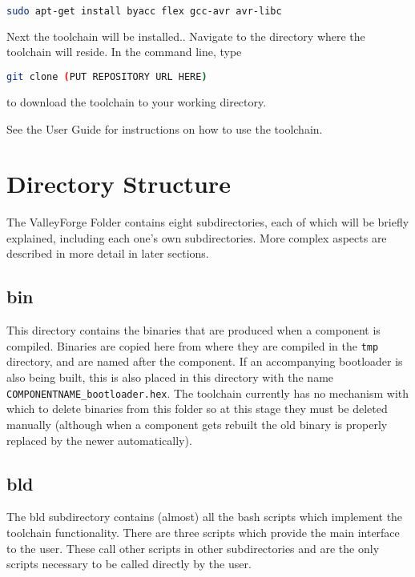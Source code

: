 \documentclass[a4paper, oneside, 11pt, titlepage, onecolumn, openright]{report}
\begin{document}
\begin{lstlisting}[frame=trBL, breaklines=true, language = bash]
sudo apt-get install byacc flex gcc-avr avr-libc
\end{lstlisting}


Next the toolchain will be installed.. Navigate to the directory where the toolchain will reside. 
In the command line, type \newline

\begin{lstlisting}[frame=trBL, breaklines=true, language = bash]
git clone (PUT REPOSITORY URL HERE)
\end{lstlisting}
to download the toolchain to your working directory.

See the User Guide for instructions on how to use the toolchain.
\pagebreak
\chapter{Directory Structure}
			\label{C:Directory Structure}
			
The ValleyForge Folder contains eight subdirectories, each of which will be briefly explained, including each one's own subdirectories. More complex aspects are described in more detail in later sections.

\section{bin}
			\label{s:bin}
			This directory contains the binaries that are produced when a component is compiled. Binaries are copied here from where they are compiled in the \texttt{tmp} directory, and are named after the component. If an accompanying bootloader is also being built, this is also placed in this directory with the name \texttt{COMPONENTNAME\_bootloader.hex}. The toolchain currently has no mechanism with which to delete binaries from this folder so at this stage they must be deleted manually (although when a component gets rebuilt the old binary is properly replaced by the newer automatically).
			
\section{bld}
			\label{s:bld}
			The bld subdirectory contains (almost) all the bash scripts which implement the toolchain functionality. There are three scripts which provide the main interface to the user. These call other scripts in other subdirectories and are the only scripts necessary to be called directly by the user.
			
\end{document}
